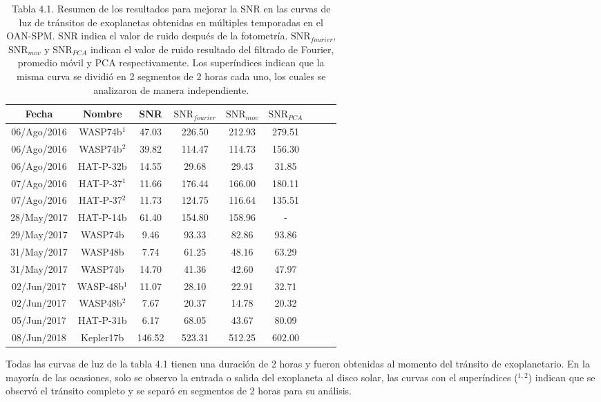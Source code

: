 \begin{table}
	\hspace{-1.7cm}
	\begin{footnotesize}
	\begin{tabular}{ccccccccc}
	\hline 
	Fecha & Nombre & SNR & $\mbox{SNR}_{fourier}$ &  $\mbox{SNR}_{mov}$ & $\mbox{SNR}_{PCA}$\\ 
	\hline
	06/Ago/2016 & WASP74b$^{1}$ & 47.03 & 226.50 & 212.93 & 279.51 \\ 
	06/Ago/2016 & WASP74b$^{2}$ & 39.82 & 114.47 & 114.73 & 156.30 \\
	06/Ago/2016 & HAT-P-32b & 14.55 & 29.68 & 29.43 & 31.85 \\
	07/Ago/2016 & HAT-P-37$^{1}$ & 11.66 & 176.44 & 166.00 & 180.11 \\ 
	07/Ago/2016 & HAT-P-37$^{2}$ & 11.73 & 124.75 & 116.64 & 135.51 \\ 
	28/May/2017 & HAT-P-14b & 61.40 & 154.80 & 158.96 & - \\ 
	29/May/2017 & WASP74b & 9.46 & 93.33 & 82.86 & 93.86 \\
	31/May/2017 & WASP48b & 7.74 & 61.25 & 48.16 & 63.29 \\  
	31/May/2017 & WASP74b & 14.70 & 41.36 & 42.60 & 47.97 \\
	02/Jun/2017 & WASP-48b$^{1}$ & 11.07 & 28.10 & 22.91 & 32.71 \\
	02/Jun/2017 & WASP48b$^{2}$ & 7.67 & 20.37 & 14.78 & 20.32 \\
	05/Jun/2017 & HAT-P-31b & 6.17 & 68.05 & 43.67 & 80.09 \\
	08/Jun/2018 & Kepler17b & 146.52 & 523.31 & 512.25 & 602.00 \\ 
	\hline 
	\end{tabular} 
	\end{footnotesize}
	\caption{Tabla 4.1. Resumen de los resultados para mejorar la SNR en las curvas de luz de tránsitos de exoplanetas obtenidas en múltiples temporadas en el OAN-SPM. SNR indica el valor de ruido después de la fotometría. $\mbox{SNR}_{fourier}$, $\mbox{SNR}_{mov}$ y $\mbox{SNR}_{PCA}$ indican el valor de ruido resultado del filtrado de Fourier, promedio móvil y PCA respectivamente. Los superíndices indican que la misma curva se dividió en 2 segmentos de 2 horas cada uno, los cuales se analizaron de manera independiente.}
	\end{table}

Todas las curvas de luz de la tabla 4.1 tienen una duración de 2 horas y fueron obtenidas al momento del tránsito de exoplanetario. En la mayoría de las ocasiones, solo se observo la entrada o salida del exoplaneta al disco solar, las curvas con el superíndices ($^{1,2}$) indican que se observó el tránsito completo y se separó en segmentos de 2 horas para su análisis.

